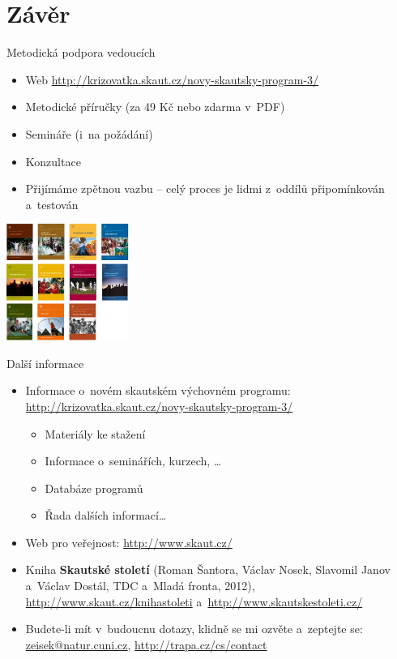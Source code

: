 \documentclass[compress,xelatex,xcolor=dvipsnames,print]{beamer}
\begin{document}
\section{Závěr}

\begin{frame}{Metodická podpora vedoucích}
\begin{itemize}
\item Web \href{http://krizovatka.skaut.cz/novy-skautsky-program-3/}{http://krizovatka.skaut.cz/novy-skautsky-program-3/}
\item Metodické příručky (za 49 Kč nebo zdarma v~PDF)
\item Semináře (i~na  požádání)
\item Konzultace
\item Přijímáme zpětnou vazbu -- celý proces je lidmi z~oddílů připomínkován a~testován
\end{itemize}
\begin{center}
\includegraphics[width=4cm]{prirucky.png}
\end{center}
\end{frame}

\begin{frame}{Další informace}
\begin{itemize}
\item Informace o~novém skautském výchovném programu: \href{http://krizovatka.skaut.cz/novy-skautsky-program-3/}{http://krizovatka.skaut.cz/novy-skautsky-program-3/}
 \begin{itemize}
 \item Materiály ke stažení
 \item Informace o~seminářích, kurzech, \ldots
 \item Databáze programů
 \item Řada dalších informací\ldots
 \end{itemize}
\item Web pro veřejnost: \href{http://www.skaut.cz/}{http://www.skaut.cz/}
\item Kniha \textbf{Skautské století} (Roman Šantora, Václav Nosek, Slavomil Janov a~Václav Dostál, TDC a~Mladá fronta, 2012), \href{http://www.skaut.cz/knihastoleti}{http://www.skaut.cz/knihastoleti} a~\href{http://www.skautskestoleti.cz/}{http://www.skautskestoleti.cz/}
\item Budete-li mít v~budoucnu dotazy, klidně se mi ozvěte a~zeptejte se: \href{mailto:zeisek@natur.cuni.cz}{zeisek@natur.cuni.cz}, \href{http://trapa.cz/cs/contact}{http://trapa.cz/cs/contact}
\end{itemize}
\end{frame}
\end{document}
